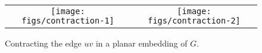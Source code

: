 \documentclass{patmorin}
\begin{document}
\begin{figure}
    \begin{center}
        \begin{tabular}{cc}
            \texttt{[image: figs/contraction-1]} &
            \texttt{[image: figs/contraction-2]}
        \end{tabular}
    \end{center}
    \caption{Contracting the edge $uv$ in a planar embedding of $G$.}
    \label{contraction}
\end{figure}








%
%
%
\end{document}
